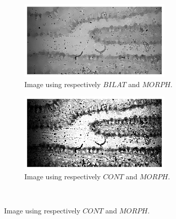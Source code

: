 \begin{figure}[h!]
     \begin{subfigure}[b]{0.5\textwidth}
        \centering
        \includegraphics[width=0.8\textwidth, frame]{afbeeldingen/rank/img_morph_bilat.png}
        \caption{Image using respectively $BILAT$ and $MORPH$.}
        \label{fig_rank_morph_bilat}
    \end{subfigure}
    \begin{subfigure}[b]{0.5\textwidth}
        \centering
        \includegraphics[width=0.8\textwidth, frame]{afbeeldingen/rank/img_morph_cont.png}
        \caption{Image using respectively $CONT$ and  $MORPH$.}
        \label{fig_rank_morph_cont}
    \end{subfigure}
\\


\end{figure}
